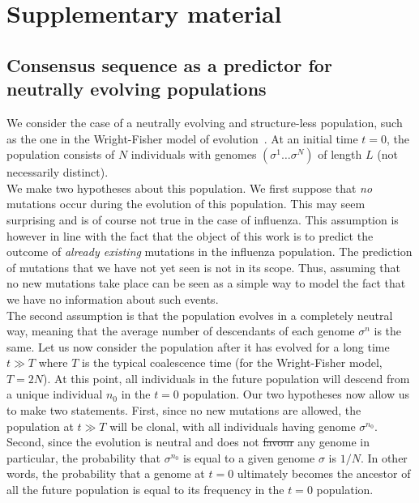\documentclass[reprint,amsmath,amssymb,superscriptaddress,showpacs,rmp]{revtex4-1}
\providecommand{\DIFadd}[1]{{\protect\color{blue}\uwave{#1}}} %
\providecommand{\DIFdel}[1]{{\protect\color{red}\sout{#1}}}                      %
\providecommand{\DIFaddbegin}{} %
\providecommand{\DIFaddend}{} %
\providecommand{\DIFdelbegin}{} %
\providecommand{\DIFdelend}{} %
\newcommand{\DIFscaledelfig}{0.5}
\newlength{\DIFdelgraphicswidth} %
\newlength{\DIFdelgraphicsheight} %
\newcommand{\DIFaddincludegraphics}[2][]{{\color{blue}\fbox{\DIFOincludegraphics[#1]{#2}}}} %
\newcommand{\DIFdelincludegraphics}[2][]{%
\sbox{\DIFdelgraphicsbox}{\DIFOincludegraphics[#1]{#2}}%
\settoboxwidth{\DIFdelgraphicswidth}{\DIFdelgraphicsbox} %
\settoboxtotalheight{\DIFdelgraphicsheight}{\DIFdelgraphicsbox} %
\scalebox{\DIFscaledelfig}{%
\parbox[b]{\DIFdelgraphicswidth}{\usebox{\DIFdelgraphicsbox}\\[-\baselineskip] \rule{\DIFdelgraphicswidth}{0em}}\llap{\resizebox{\DIFdelgraphicswidth}{\DIFdelgraphicsheight}{%
\setlength{\unitlength}{\DIFdelgraphicswidth}%
\begin{picture}(1,1)%
\thicklines\linethickness{2pt} %
{\color[rgb]{1,0,0}\put(0,0){\framebox(1,1){}}}%
{\color[rgb]{1,0,0}\put(0,0){\line( 1,1){1}}}%
{\color[rgb]{1,0,0}\put(0,1){\line(1,-1){1}}}%
\end{picture}%
}\hspace*{3pt}}} %
} %
\DeclareRobustCommand{\DIFaddbegin}{\DIFOaddbegin \let\includegraphics\DIFaddincludegraphics} %
\DeclareRobustCommand{\DIFaddend}{\DIFOaddend \let\includegraphics\DIFOincludegraphics} %
\DeclareRobustCommand{\DIFdelbegin}{\DIFOdelbegin \let\includegraphics\DIFdelincludegraphics} %
\DeclareRobustCommand{\DIFdelend}{\DIFOaddend \let\includegraphics\DIFOincludegraphics} %
\begin{document}
\section*{Supplementary material} %
\label{sec:supplementary_material}

\subsection{Consensus sequence as a predictor for neutrally evolving populations} %
\label{sub:consensus_sequence_as_a_predictor}

	We consider the case of a neutrally evolving and structure-less population, such as the one in the Wright-Fisher model of evolution~\cite{10.1080/10635150500354860}. At an initial time $t=0$, the population consists of $N$ individuals with genomes $(\sigma^1\ldots\sigma^N)$ of length $L$ (not necessarily distinct). \\
	We make two hypotheses about this population. We first suppose that \emph{no} mutations occur during the evolution of this population. This may seem surprising and is of course not true in the case of influenza. This assumption is however in line with the fact that the object of this work is to predict the outcome of \emph{already existing} mutations in the influenza population. The prediction of mutations that we have not yet seen is not in its scope. Thus, assuming that no new mutations take place can be seen as a simple way to model the fact that we have no information about such events. \\
	The second assumption is that the population evolves in a completely neutral way, meaning that the average number of descendants of each genome $\sigma^n$ is the same. Let us now consider the population after it has evolved for a long time $t\gg T$ where $T$ is the typical coalescence time (for the Wright-Fisher model, $T=2N$). At this point, all individuals in the future population will descend from a unique individual $n_0$ in the $t=0$ population. Our two hypotheses now allow us to make two statements. First, since no new mutations are allowed, the population at $t\gg T$ will be clonal, with all individuals having genome $\sigma^{n_0}$. Second, since the evolution is neutral and does not \DIFdelbegin \DIFdel{favour }\DIFdelend \DIFaddbegin \DIFadd{favor }\DIFaddend any genome in particular, the probability that $\sigma^{n_0}$ is equal to a given genome $\sigma$ is $1/N$. In other words, the probability that a genome at $t=0$ ultimately becomes the ancestor of all the future population is equal to its frequency in the $t=0$ population. \\
\end{document}
